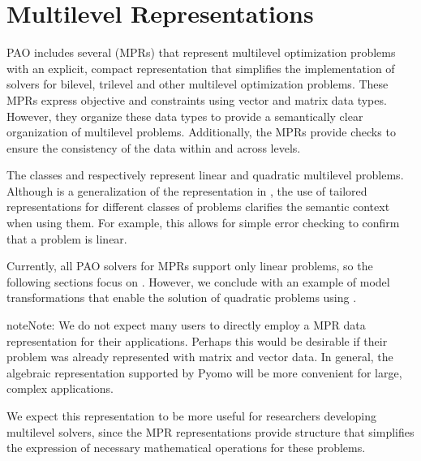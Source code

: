 \documentclass[letterpaper,10pt,english]{sphinxmanual}
\begin{document}
\section{Multilevel Representations}
\label{\detokenize{representations/mpr:multilevel-representations}}\label{\detokenize{representations/mpr::doc}}
PAO includes several  (MPRs)
that represent multilevel optimization problems with an explicit,
compact representation that simplifies the implementation of solvers for
bilevel, trilevel and other multilevel optimization problems.  These MPRs
express objective and constraints using vector and matrix data types.
However, they organize these data types to provide a semantically clear
organization of multilevel problems.  Additionally, the MPRs provide
checks to ensure the consistency of the data within and across levels.

The classes {\hyperref[\detokenize{reference/mpr:pao.mpr.repn.LinearMultilevelProblem}]{}}
and {\hyperref[\detokenize{reference/mpr:pao.mpr.repn.QuadraticMultilevelProblem}]{}} respectively
represent linear and quadratic multilevel problems.  Although
{\hyperref[\detokenize{reference/mpr:pao.mpr.repn.QuadraticMultilevelProblem}]{}} is a generalization of the
representation in {\hyperref[\detokenize{reference/mpr:pao.mpr.repn.LinearMultilevelProblem}]{}}, the use of tailored
representations for different classes of problems clarifies the semantic
context when using them.  For example, this allows for simple error checking
to confirm that a problem is linear.

Currently, all PAO solvers for MPRs support only linear problems, so the
following sections focus on {\hyperref[\detokenize{reference/mpr:pao.mpr.repn.LinearMultilevelProblem}]{}}.  However,
we conclude with an example of model transformations that enable the
solution of quadratic problems using {\hyperref[\detokenize{reference/mpr:pao.mpr.repn.QuadraticMultilevelProblem}]{}}.

\begin{sphinxadmonition}{note}{Note:}
We do not expect many users to directly employ a MPR data
representation for their applications.  Perhaps this would be
desirable if their problem was already represented with matrix and
vector data.  In general, the algebraic representation supported by
Pyomo will be more convenient for large, complex applications.

We expect this representation to be more useful for researchers
developing multilevel solvers, since the MPR representations provide
structure that simplifies the expression of necessary mathematical
operations for these problems.
\end{sphinxadmonition}
\end{document}
